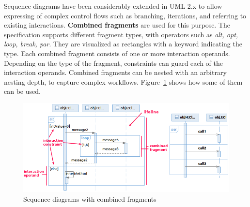 \documentclass[letter]{llncs}
\begin{document}
Sequence diagrams have been considerably extended in UML 2.x to allow expressing of complex control 
flows such as branching, iterations, and referring to existing interactions.
\textbf{Combined fragments} are used for this purpose. The specification
supports different fragment types, with operators such as \emph{alt, opt, loop, break, par}. They are
visualized as rectangles with a keyword indicating the type.
Each combined fragment consists of one or more interaction operands. Depending
on the type of the fragment, constraints can guard each of the interaction operands. 
Combined fragments can be nested with an arbitrary nesting
depth, to capture complex workflows. Figure~\ref{fig:SDExample} shows how some of them can be
used. 
\begin{figure}[!t]
\centering
\includegraphics[width=1.0\linewidth,keepaspectratio=true]{./Figure2_merged.png}
\caption{Sequence diagrams with combined fragments}
\label{fig:SDExample}
\end{figure}
\end{document}
